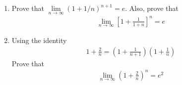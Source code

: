 \documentclass[11pt, letterpaper]{article}
\begin{document}
\begin{enumerate}
{	\setcounter{equation}{0}
	\begin{eqnarray}
		\lim \limits_{n \to \infty} \frac{s_n - 1}{s_n + 1} = 0 \\
		\we \nonumber \\
		\lim \limits_{n \to \infty} \frac{s_n}{t_n} = \frac{\lim \limits_{n \to \infty} s_n}{\lim \limits_{n \to \infty} t_n} \\
		\mathrm{Applying \space (2) \space in \space (1)} \nonumber \\
		\frac{\lim \limits_{n \to \infty} s_n - 1}{\lim \limits_{n \to \infty} s_n+1}=0 \nonumber \\
		\lim \limits_{n \to \infty} s_n-1 = 0 \\
		\wealso \nonumber \\
		\lim \limits_{n \to \infty} s_n - t_n = \lim \limits_{n \to \infty} s_n - \lim \limits_{n \to \infty} t_n 		
	\end{eqnarray}
	\begin{eqnarray}
		\mathrm{Applying \space (4)\space in \space (3)} \nonumber \\
		\lim \limits_{n \to \infty} s_n - \lim \limits_{n \to \infty} 1 = 0 \\
		\lim \limits_{n \to \infty} s_n = \lim \limits_{n \to \infty} 1 \\
		\we \lim \limits_{n \to \infty} 1 = 1 \\
		\from \mathrm{(6) \space and \space (7)} \nonumber \\
		\lim \limits_{n \to \infty} s_n = 1 \nonumber \\
		\hence \nonumber
	\end{eqnarray}
}

\item{Prove that $\lim \limits_{n \to \infty} (1 + 1/n)^{n+1} = e$. Also, prove that
	\begin{align*}
	\lim \limits_{n \to \infty} \left[ 1 + \frac{1}{1+n} \right]^n = e
	\end{align*}
}

\item{Using the identity 
	\begin{align*}
		1 + \frac{2}{n} = \left( 1 + \frac{1}{n+1}\right) \left( 1 + \frac{1}{n}\right)
	\end{align*}
	Prove that 
	\begin{align*}
		\lim \limits_{n \to \infty} \left(1 + \frac{2}{n} \right)^n = e^2
	\end{align*}
	
}
\end{enumerate}
\end{document}
